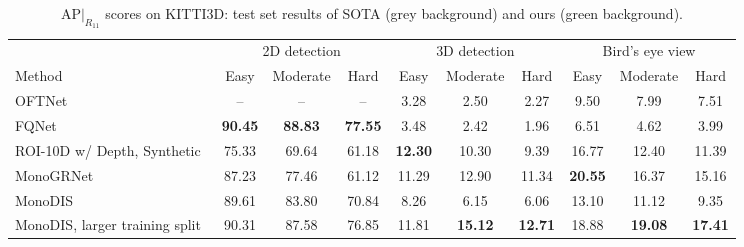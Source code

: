 \documentclass[10pt,twocolumn,letterpaper]{article}
\newcommand{\monodis}{MonoDIS}
\begin{document}
\begin{table*}
    \centering
    {\footnotesize
    \begin{tabular}{l|ccc|ccc|ccc}
        \toprule
        & \multicolumn{3}{c|}{2D detection} & \multicolumn{3}{c|}{3D detection} & \multicolumn{3}{c}{Bird's eye view} \\
        Method & Easy & Moderate & Hard & Easy & Moderate & Hard & Easy & Moderate & Hard \\
        \midrule
        \rowcolor[gray]{\gc}
        OFTNet~\cite{Roddick18} & -- & -- & -- & 3.28 & 2.50 & 2.27 & 9.50 & 7.99 & 7.51 \\
        \rowcolor[gray]{\gc}
        FQNet~\cite{Liu+19} & \textbf{90.45} & \textbf{88.83} & \textbf{77.55} & 3.48 & 2.42 & 1.96 & 6.51 & 4.62 & 3.99 \\
        \rowcolor[gray]{\gc}
        ROI-10D w/ Depth, Synthetic~\cite{Manhardt_2019_CVPR} & 75.33 & 69.64 & 61.18 & \textbf{12.30} & 10.30 & 9.39 & 16.77 & 12.40 & 11.39 \\
        \rowcolor[gray]{\gc}
        MonoGRNet~\cite{qin2019monogrnet} & 87.23 & 77.46 & 61.12 & 11.29 & 12.90 & 11.34 & \textbf{20.55} & 16.37 & 15.16 \\
        \rowcolor{mapillarygreen}
        \monodis{} & 89.61 & 83.80 & 70.84 & 8.26 & 6.15 & 6.06 & 13.10 & 11.12 & 9.35 \\
        \rowcolor{mapillarygreen}
        \monodis{}, larger training split
        & 90.31 &  87.58 & 76.85 & 11.81 & \textbf{15.12}& \textbf{12.71} & 18.88 & \textbf{19.08} & \textbf{17.41} \\
        \bottomrule
    \end{tabular}}
    \caption{$\text{AP}|_{R_{11}}$ scores on KITTI3D: test set results of SOTA (grey background) and ours (green background).}
    \label{tab:ap11-test}
    \vspace{-10pt}
\end{table*}
\end{document}
